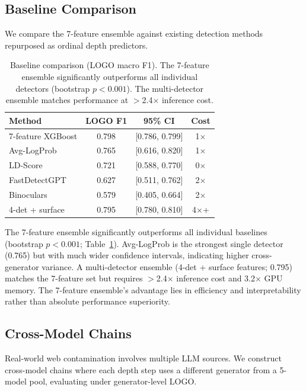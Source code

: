 \documentclass[11pt,a4paper]{article}
\begin{document}
\subsection{Baseline Comparison}
\label{sec:baseline}

We compare the 7-feature ensemble against existing detection methods repurposed as ordinal depth predictors.

\begin{table}[t]
\centering
\small
\begin{tabular}{lccc}
\toprule
\textbf{Method} & \textbf{LOGO F1} & \textbf{95\% CI} & \textbf{Cost} \\
\midrule
7-feature XGBoost & 0.798 & [0.786, 0.799] & 1$\times$ \\
Avg-LogProb & 0.765 & [0.616, 0.820] & 1$\times$ \\
LD-Score & 0.721 & [0.588, 0.770] & 0$\times$ \\
FastDetectGPT & 0.627 & [0.511, 0.762] & 2$\times$ \\
Binoculars & 0.579 & [0.405, 0.664] & 2$\times$ \\
4-det + surface & 0.795 & [0.780, 0.810] & 4$\times$+ \\
\bottomrule
\end{tabular}
\caption{Baseline comparison (LOGO macro F1). The 7-feature ensemble significantly outperforms all individual detectors (bootstrap $p < 0.001$). The multi-detector ensemble matches performance at $>$2.4$\times$ inference cost.}
\label{tab:baseline}
\end{table}

The 7-feature ensemble significantly outperforms all individual baselines (bootstrap $p < 0.001$; Table~\ref{tab:baseline}).
Avg-LogProb is the strongest single detector (0.765) but with much wider confidence intervals, indicating higher cross-generator variance.
A multi-detector ensemble (4-det + surface features; 0.795) matches the 7-feature set but requires $>$2.4$\times$ inference cost and 3.2$\times$ GPU memory.
The 7-feature ensemble's advantage lies in efficiency and interpretability rather than absolute performance superiority.

\subsection{Cross-Model Chains}

Real-world web contamination involves multiple LLM sources.
We construct cross-model chains where each depth step uses a different generator from a 5-model pool, evaluating under generator-level LOGO.
\end{document}
